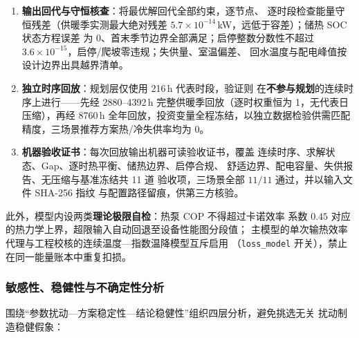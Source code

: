 \begin{enumerate}[label=（\arabic*）,leftmargin=2.6em,itemsep=3pt]
  \item \textbf{输出回代与守恒核查}：将最优解回代全部约束，逐节点、
        逐时段检查能量守恒残差（供暖季实测最大绝对残差
        $5.7\times10^{-14}$\,kW，远低于容差）；储热 SOC 状态方程误差
        为 0、首末季节边界全部满足；启停整数分数性不超过
        $3.6\times10^{-15}$，启停/爬坡零违规；失供量、室温偏差、
        回水温度与配电峰值按设计边界出具越界清单。
  \item \textbf{独立时序回放}：规划层仅使用 216\,h 代表时段，验证则
        在\textbf{不参与规划}的连续时序上进行——先经 2880--4392\,h
        完整供暖季回放（逐时权重恒为 1，无代表日压缩），再经
        8760\,h 全年回放，投资变量全程冻结，以独立数据检验供需匹配
        精度，三场景推荐方案热/冷失供率均为 0。
  \item \textbf{机器验收证书}：每次回放输出机器可读验收证书，覆盖
        连续时序、求解状态、Gap、逐时热平衡、储热边界、启停合规、
        舒适边界、配电容量、失供报告、无压缩与基准冻结共 11 道
        验收项，三场景全部 $11/11$ 通过，并以输入文件 SHA-256 指纹
        与配置路径留痕，供第三方核验。
\end{enumerate}

此外，模型内设两类\textbf{理论极限自检}：热泵 COP 不得超过卡诺效率
系数 $0.45$ 对应的热力学上界，超限输入自动回退至设备性能图分段值；
主模型的单次输热效率代理与工程校核的连续温度—指数温降模型互斥启用
（\texttt{loss\_model} 开关），禁止在同一能量账本中重复扣损。

\subsubsection{敏感性、稳健性与不确定性分析}

围绕“参数扰动—方案稳定性—结论稳健性”组织四层分析，避免挑选无关
扰动制造稳健假象：

